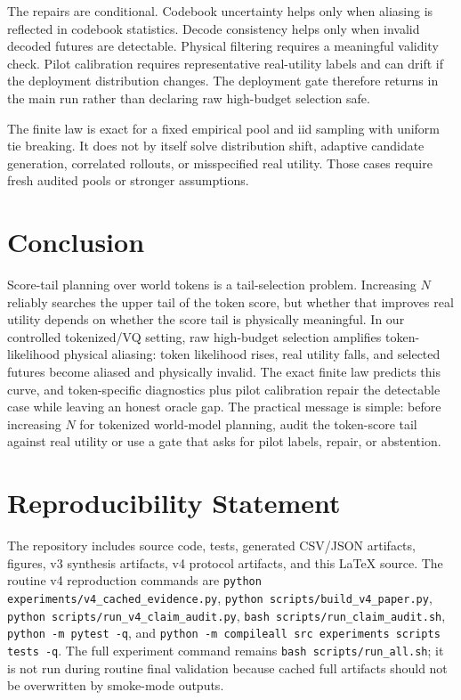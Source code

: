 \documentclass{article}
\newcommand{\twma}{token-likelihood physical aliasing}
\begin{document}
The repairs are conditional. Codebook uncertainty helps only when aliasing is reflected in codebook statistics. Decode consistency helps only when invalid decoded futures are detectable. Physical filtering requires a meaningful validity check. Pilot calibration requires representative real-utility labels and can drift if the deployment distribution changes. The deployment gate therefore returns \VThreeGateAction{} in the main run rather than declaring raw high-budget selection safe.

The finite law is exact for a fixed empirical pool and iid sampling with uniform tie breaking. It does not by itself solve distribution shift, adaptive candidate generation, correlated rollouts, or misspecified real utility. Those cases require fresh audited pools or stronger assumptions.

\section{Conclusion}

Score-tail planning over world tokens is a tail-selection problem. Increasing $N$ reliably searches the upper tail of the token score, but whether that improves real utility depends on whether the score tail is physically meaningful. In our controlled tokenized/VQ setting, raw high-budget selection amplifies \twma{}: token likelihood rises, real utility falls, and selected futures become aliased and physically invalid. The exact finite law predicts this curve, and token-specific diagnostics plus pilot calibration repair the detectable case while leaving an honest oracle gap. The practical message is simple: before increasing $N$ for tokenized world-model planning, audit the token-score tail against real utility or use a gate that asks for pilot labels, repair, or abstention.

\section*{Reproducibility Statement}
The repository includes source code, tests, generated CSV/JSON artifacts, figures, v3 synthesis artifacts, v4 protocol artifacts, and this LaTeX source. The routine v4 reproduction commands are \texttt{python experiments/v4\_cached\_evidence.py}, \texttt{python scripts/build\_v4\_paper.py}, \texttt{python scripts/run\_v4\_claim\_audit.py}, \texttt{bash scripts/run\_claim\_audit.sh}, \texttt{python -m pytest -q}, and \texttt{python -m compileall src experiments scripts tests -q}. The full experiment command remains \texttt{bash scripts/run\_all.sh}; it is not run during routine final validation because cached full artifacts should not be overwritten by smoke-mode outputs.
\end{document}
